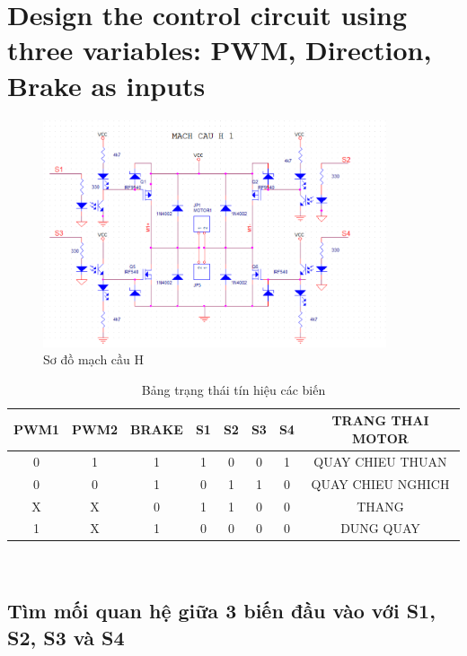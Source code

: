 \section{Design the control circuit using three variables: PWM, Direction, Brake as inputs}
    \begin{figure}[H]
        \centering
        \includegraphics[width=0.9\textwidth]{pictures/3_diagram.png}
        \caption{Sơ đồ mạch cầu H}
        \label{fig:3_diagram}
    \end{figure}
    \begin{table}[H]
        \centering
        \begin{tabular}{|c|c|c|c|c|c|c|c|}
            \hline
            PWM1 & PWM2 & BRAKE & S1 & S2 & S3 & S4 & TRANG THAI MOTOR \\
            \hline
            0 & 1 & 1 & 1 & 0 & 0 & 1 & QUAY CHIEU THUAN \\
            \hline
            0 & 0 & 1 & 0 & 1 & 1 & 0 & QUAY CHIEU NGHICH \\
            \hline
            X & X & 0 & 1 & 1 & 0 & 0 & THANG \\
            \hline
            1 & X & 1 & 0 & 0 & 0 & 0 & DUNG QUAY \\
            \hline
        \end{tabular}\\
        \caption{Bảng trạng thái tín hiệu các biến}
        \label{tab:motor_states}
    \end{table}
    \subsection{Tìm mối quan hệ giữa 3 biến đầu vào với S1, S2, S3 và S4}

